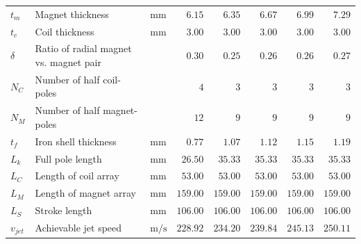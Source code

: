 \begin{landscape}
\begin{table}
\begin{tabular}{lllrrrrr}
                        $t_m$      & Magnet thickness                       & $\mathrm{mm}$  & $6.15$                & $6.35$            & $6.67$            & $6.99$            & $7.29$            \\
                        $t_c$      & Coil thickness                         & $\mathrm{mm}$  & $3.00$                & $3.00$            & $3.00$            & $3.00$            & $3.00$            \\
                        $\delta$   & Ratio of radial magnet vs. magnet pair &                & $0.30$                & $0.25$            & $0.26$            & $0.26$            & $0.27$            \\
                        $N_C$      & Number of half coil-poles              &                & $4$                   & $3$               & $3$               & $3$               & $3$               \\
                        $N_M$      & Number of half magnet-poles            &                & $12$                  & $9$               & $9$               & $9$               & $9$               \\
                        \hline
                        $t_f$      & Iron shell thickness                   & $\mathrm{mm}$  & $0.77$                        & $1.07$            & $1.12$            & $1.15$            & $1.19$    \\       
                        $L_k$      & Full pole length                       & $\mathrm{mm}$  & $26.50$               & $35.33$           & $35.33$           & $35.33$           & $35.33$           \\
                        $L_C$      & Length of coil array                   & $\mathrm{mm}$  & $53.00$               & $53.00$           & $53.00$           & $53.00$           & $53.00$           \\
                        $L_M$      & Length of magnet array                 & $\mathrm{mm}$  & $159.00$              & $159.00$          & $159.00$          & $159.00$          & $159.00$          \\
                        $L_S$      & Stroke length                          & $\mathrm{mm}$  & $106.00$              & $106.00$          & $106.00$          & $106.00$          & $106.00$          \\
                        \hline
                        $v_{jet}$  & Achievable jet speed                   & $\mathrm{m/s}$ & $228.92$              & $234.20$          & $239.84$          & $245.13$          & $250.11$         \\

\end{tabular}
\end{table}
\end{landscape}
